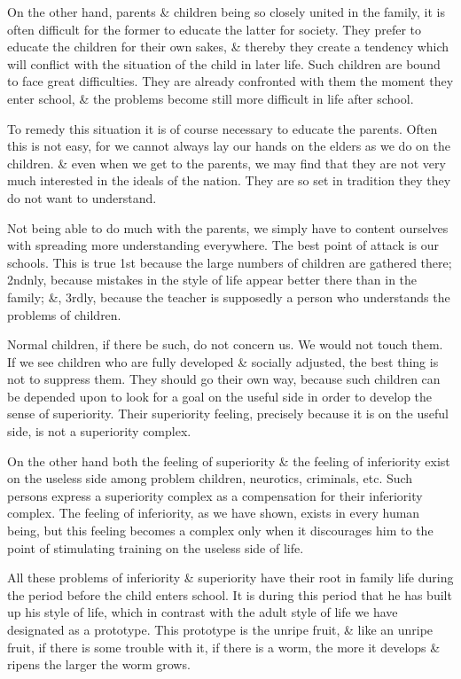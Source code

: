 \documentclass{article}
\numberwithin{equation}{section}
\begin{document}
On the other hand, parents \& children being so closely united in the family, it is often difficult for the former to educate the latter for society. They prefer to educate the children for their own sakes, \& thereby they create a tendency which will conflict with the situation of the child in later life. Such children are bound to face great difficulties. They are already confronted with them the moment they enter school, \& the problems become still more difficult in life after school.

To remedy this situation it is of course necessary to educate the parents. Often this is not easy, for we cannot always lay our hands on the elders as we do on the children. \& even when we get to the parents, we may find that they are not very much interested in the ideals of the nation. They are so set in tradition they they do not want to understand.

Not being able to do much with the parents, we simply have to content ourselves with spreading more understanding everywhere. The best point of attack is our schools. This is true 1st because the large numbers of children are gathered there; 2ndnly, because mistakes in the style of life appear better there than in the family; \&, 3rdly, because the teacher is supposedly a person who understands the problems of children.

Normal children, if there be such, do not concern us. We would not touch them. If we see children who are fully developed \& socially adjusted, the best thing is not to suppress them. They should go their own way, because such children can be depended upon to look for a goal on the useful side in order to develop the sense of superiority. Their superiority feeling, precisely because it is on the useful side, is not a superiority complex.

On the other hand both the feeling of superiority \& the feeling of inferiority exist on the useless side among problem children, neurotics, criminals, etc. Such persons express a superiority complex as a compensation for their inferiority complex. The feeling of inferiority, as we have shown, exists in every human being, but this feeling becomes a complex only when it discourages him to the point of stimulating training on the useless side of life.

All these problems of inferiority \& superiority have their root in family life during the period before the child enters school. It is during this period that he has built up his style of life, which in contrast with the adult style of life we have designated as a prototype. This prototype is the unripe fruit, \& like an unripe fruit, if there is some trouble with it, if there is a worm, the more it develops \& ripens the larger the worm grows.
\end{document}
